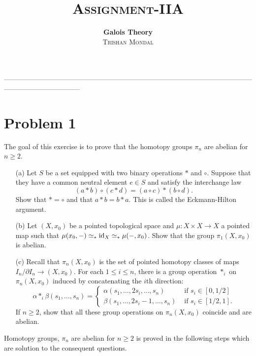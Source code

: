 \documentclass[11pt]{article}
\title{{\Huge \textsc{Assignment-IIA}}}
\author{\textbf{ \textsf{Galois Theory}} \\[0.2cm]
 \large \textsc{Trishan Mondal}}
\date{}
\begin{document}
   \maketitle
   ---------------------------------------------------------------------------------------------------------------------------------------------
   \section{Problem 1}

 \begin{prob}{}{}
    The goal of this exercise is to prove that the homotopy groups $\pi_n$ are abelian for $n \geq 2$. 
\begin{enumerate}
    \item[(a)] Let $S$ be a set equipped with two binary operations $\ast$ and $\circ$. Suppose that they have a common neutral element $e \in S$ and satisfy the interchange law 
    \[
        (a \ast b) \circ (c \ast d) = (a \circ c) \ast (b \circ d).    
    \] 
    Show that $\ast = \circ$ and that $a \ast b = b \ast a$. This is called the Eckmann-Hilton argument. 
    \item[(b)] Let $(X,x_0)$ be a pointed topological space and $\mu : X \times X \to X$ a pointed map such that $\mu(x_0, -) \simeq_* \mathrm{id}_X \simeq_* \mu(-,x_0)$. Show that the group $\pi_1(X,x_0)$ is abelian. 
    \item[(c)] Recall that $\pi_n(X,x_0)$ is the set of pointed homotopy classes of maps $I_n/\partial I_n \to (X,x_0)$. For each $1 \leq i \leq n$, there is a group operation $\ast_i$ on $\pi_n(X,x_0)$ induced by concatenating the $i$th direction: 
    \[
        \alpha \ast_i \beta (s_1,\dots,s_n) = \begin{cases}
            \alpha(s_1,\dots,2s_i, \dots, s_n) & \mbox{ if } s_i \in [0,1/2] \\ 
            \beta(s_1,\dots,2s_i - 1, \dots, s_n) & \mbox{ if } s_i \in [1/2,1].
        \end{cases}    
    \]
    If $n \geq 2$, show that all these group operations on $\pi_n(X,x_0)$ coincide and are abelian.
\end{enumerate}
 \end{prob}

 \sol Homotopy groups, $\pi_n$ are abelian for $n \geq 2$ is proved in the following steps which are solution to the consequent questions.
\end{document}
